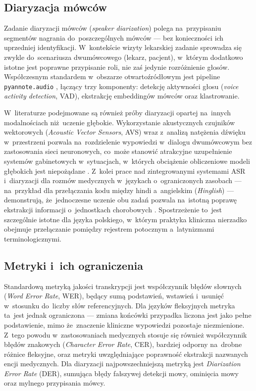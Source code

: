 \subsection{Diaryzacja mówców}

Zadanie diaryzacji mówców (\emph{speaker diarization}) polega
na~przypisaniu segmentów nagrania do~poszczególnych mówców --- bez
konieczności ich uprzedniej identyfikacji. W~kontekście wizyty
lekarskiej zadanie sprowadza się zwykle do~scenariusza dwumówcowego
(lekarz, pacjent), w~którym dodatkowo istotne jest poprawne
przypisanie roli, nie zaś jedynie rozróżnienie głosów. Współczesnym
standardem w~obszarze otwartoźródłowym jest pipeline
\texttt{pyannote.audio} \parencite{bredin2023pyannote}, łączący trzy
komponenty: detekcję aktywności głosu (\emph{voice activity
detection}, VAD), ekstrakcję embeddingów mówców oraz klastrowanie.

W~literaturze podejmowane są również próby diaryzacji opartej
na~innych modalnościach niż~uczenie głębokie. Wykorzystanie
akustycznych czujników wektorowych (\emph{Acoustic Vector Sensors},
AVS) wraz z~analizą natężenia dźwięku w~przestrzeni pozwala
na~rozdzielenie wypowiedzi w~dialogu dwumówcowym bez zastosowania
sieci neuronowych, co~może stanowić atrakcyjne uzupełnienie systemów
gabinetowych w~sytuacjach, w~których obciążenie obliczeniowe
modeli głębokich jest niepożądane \parencite{avsdiarization}. Z~kolei
prace nad zintegrowanymi systemami ASR i~diaryzacji dla rozmów
medycznych w~językach o~ograniczonych zasobach --- na~przykład dla
przełączania kodu między hindi a~angielskim (\emph{Hinglish}) ---
demonstrują, że~jednoczesne uczenie obu zadań pozwala na~istotną
poprawę ekstrakcji informacji o~jednostkach chorobowych
\parencite{hinglishdoctorpatient}. Spostrzeżenie to~jest szczególnie
istotne dla języka polskiego, w~którym praktyka kliniczna nierzadko
obejmuje przełączanie pomiędzy rejestrem potocznym a~latynizmami
terminologicznymi.

\subsection{Metryki i~ich ograniczenia}

Standardową metryką jakości transkrypcji jest współczynnik błędów
słownych (\emph{Word Error Rate}, WER), będący sumą podstawień,
wstawień i~usunięć w~stosunku do~liczby słów referencyjnych.
Dla języków fleksyjnych metryka ta~jest jednak ograniczona ---
zmiana końcówki przypadka liczona jest jako pełne podstawienie, mimo
że~znaczenie kliniczne wypowiedzi pozostaje niezmienione. Z~tego
powodu w~zastosowaniach medycznych stosuje się również współczynnik
błędów znakowych (\emph{Character Error Rate}, CER), bardziej
odporny na~drobne różnice fleksyjne, oraz metryki uwzględniające
poprawność ekstrakcji nazwanych encji medycznych. Dla diaryzacji
najpowszechniejszą metryką jest \emph{Diarization Error Rate} (DER),
sumująca błędy fałszywej detekcji mowy, ominięcia mowy oraz
mylnego przypisania mówcy.

